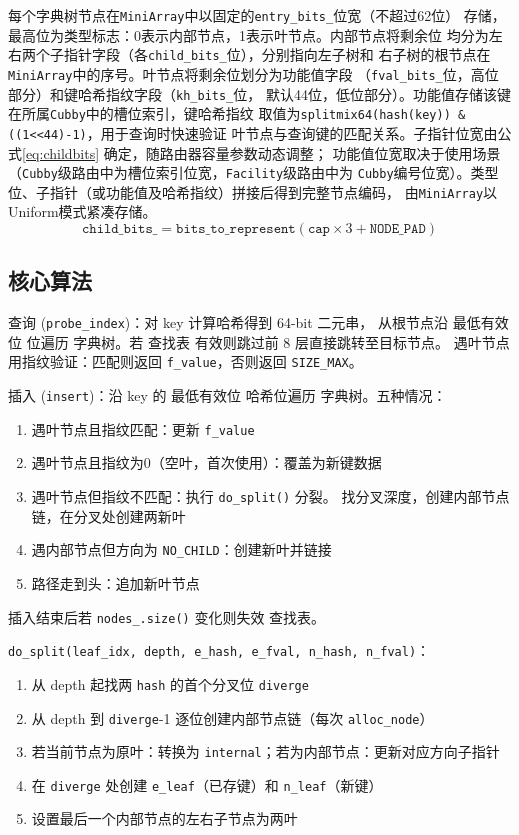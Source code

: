 \documentclass[
    type = bachelor,
    fontset = win,
    decl-page = true,
  ]{njuthesis}
\begin{document}
每个字典树节点在\texttt{MiniArray}中以固定的\texttt{entry\_bits\_}位宽（不超过62位）
存储，最高位为类型标志：0表示内部节点，1表示叶节点。内部节点将剩余位
均分为左右两个子指针字段（各\texttt{child\_bits\_}位），分别指向左子树和
右子树的根节点在\texttt{MiniArray}中的序号。叶节点将剩余位划分为功能值字段
（\texttt{fval\_bits\_}位，高位部分）和键哈希指纹字段（\texttt{kh\_bits\_}位，
默认44位，低位部分）。功能值存储该键在所属\texttt{Cubby}中的槽位索引，键哈希指纹
取值为\texttt{splitmix64(hash(key)) \& ((1<<44)-1)}，用于查询时快速验证
叶节点与查询键的匹配关系。子指针位宽由公式\ref{eq:childbits}
确定，随路由器容量参数动态调整；
功能值位宽取决于使用场景（\texttt{Cubby}级路由中为槽位索引位宽，\texttt{Facility}级路由中为
\texttt{Cubby}编号位宽）。类型位、子指针（或功能值及哈希指纹）拼接后得到完整节点编码，
由\texttt{MiniArray}以Uniform模式紧凑存储。
\begin{equation}
  \texttt{child\_bits\_} = \texttt{bits\_to\_represent}
(\texttt{cap} \times 3 + \texttt{NODE\_PAD})
\label{eq:childbits}
\end{equation}

\subsection{核心算法}

查询 (\texttt{probe\_index})：对 key 计算哈希得到 64-bit 二元串，
从根节点沿 最低有效位 位遍历 字典树。若 查找表 有效则跳过前 8 层直接跳转至目标节点。
遇叶节点用指纹验证：匹配则返回 \texttt{f\_value}，否则返回 \texttt{SIZE\_MAX}。

插入 (\texttt{insert})：沿 key 的 最低有效位 哈希位遍历 字典树。五种情况：
\begin{enumerate}
  \item 遇叶节点且指纹匹配：更新 \texttt{f\_value}
  \item 遇叶节点且指纹为0（空叶，首次使用）：覆盖为新键数据
  \item 遇叶节点但指纹不匹配：执行 \texttt{do\_split()} 分裂。
    找分叉深度，创建内部节点链，在分叉处创建两新叶
  \item 遇内部节点但方向为 \texttt{NO\_CHILD}：创建新叶并链接
  \item 路径走到头：追加新叶节点
\end{enumerate}
插入结束后若 \texttt{nodes\_.size()} 变化则失效 查找表。

\texttt{do\_split(leaf\_idx, depth, e\_hash, e\_fval, n\_hash, n\_fval)}：
\begin{enumerate}
  \item 从 depth 起找两 \texttt{hash} 的首个分叉位 \texttt{diverge}
  \item 从 depth 到 \texttt{diverge}-1 逐位创建内部节点链（每次 \texttt{alloc\_node}）
  \item 若当前节点为原叶：转换为 \texttt{internal}；若为内部节点：更新对应方向子指针
  \item 在 \texttt{diverge} 处创建 \texttt{e\_leaf}（已存键）和 \texttt{n\_leaf}（新键）
  \item 设置最后一个内部节点的左右子节点为两叶
\end{enumerate}
\end{document}
